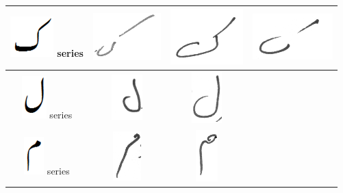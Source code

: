 \documentclass[a4paper,conference]{IEEEtran}
\begin{document}
\begin{table}[h]
\begin{tabular}{@{}cccc@{}}
\hline
\includegraphics[scale=0.15]{kaaf_orig} series & \includegraphics[scale=0.15]{kaaf2} & \includegraphics[scale=0.15]{kaaf3}  & 
\includegraphics[scale=0.15]{kaaf} \\
\hline
\includegraphics[scale=0.15]{Laam_orig} series & \includegraphics[scale=0.15]{laaam} & \includegraphics[scale=0.15]{laam2}  &  \\
\hline
\includegraphics[scale=0.15]{meem_orig} series & \includegraphics[scale=0.15]{meem} & \includegraphics[scale=0.15]{meem2}  &  \\

\end{tabular}
\end{table}
\end{document}
